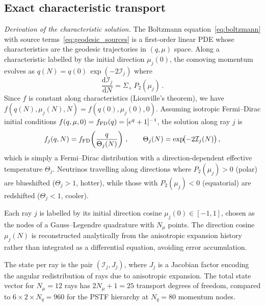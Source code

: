 \documentclass[a4paper,11pt]{article}
\newcommand{\Sig}{\Sigma}
\newcommand{\dd}{\mathrm{d}}
\begin{document}
\subsection{Exact characteristic transport}\label{sec:characteristic}

\textit{Derivation of the characteristic solution.}  The Boltzmann equation~\eqref{eq:boltzmann} with source terms~\eqref{eq:geodesic_sources} is a first-order linear PDE whose characteristics are the geodesic trajectories in $(q, \mu)$ space.  Along a characteristic labelled by the initial direction $\mu_j(0)$, the comoving momentum evolves as $q(N) = q(0)\,\exp(-2\mathcal{I}_j)$ where
\begin{equation}
\frac{\dd\mathcal{I}_j}{\dd N} = \Sig_+\,P_2(\mu_j)\,.\label{eq:dI}
\end{equation}
Since $f$ is constant along characteristics (Liouville's theorem), we have $f(q(N), \mu_j(N), N) = f(q(0), \mu_j(0), 0)$.  Assuming isotropic Fermi--Dirac initial conditions $f(q, \mu, 0) = f_{\rm FD}(q) = [e^q + 1]^{-1}$, the solution along ray $j$ is
\begin{equation}
f_j(q,N) = f_{\rm FD}\!\left(\frac{q}{\Theta_j(N)}\right)\,,\qquad \Theta_j(N) = \exp\!\bigl(-2\mathcal{I}_j(N)\bigr)\,,\label{eq:char_sol}
\end{equation}
which is simply a Fermi--Dirac distribution with a direction-dependent effective temperature $\Theta_j$.  Neutrinos travelling along directions where $P_2(\mu_j) > 0$ (polar) are blueshifted ($\Theta_j > 1$, hotter), while those with $P_2(\mu_j) < 0$ (equatorial) are redshifted ($\Theta_j < 1$, cooler).

Each ray $j$ is labelled by its initial direction cosine $\mu_j(0) \in [-1,1]$, chosen as the nodes of a Gauss--Legendre quadrature with $N_\mu$ points.  The direction cosine $\mu_j(N)$ is reconstructed analytically from the anisotropic expansion history rather than integrated as a differential equation, avoiding error accumulation.

The state per ray is the pair $(\mathcal{I}_j, J_j)$, where $J_j$ is a Jacobian factor encoding the angular redistribution of rays due to anisotropic expansion.  The total state vector for $N_\mu = 12$ rays has $2N_\mu + 1 = 25$ transport degrees of freedom, compared to $6\times 2\times N_q = 960$ for the PSTF hierarchy at $N_q = 80$ momentum nodes.
\end{document}
